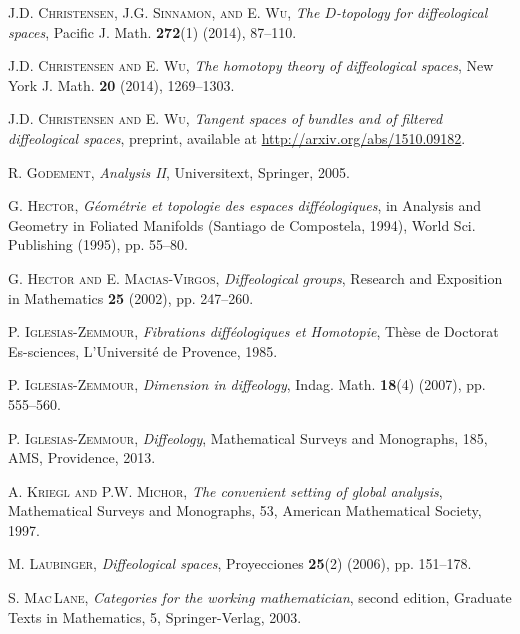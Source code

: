 \documentclass{amsart}
\theoremstyle{remark}
\begin{document}
\begin{thebibliography}{CSW}

     {\scshape J.D. Christensen, J.G. Sinnamon, and E. Wu},
    \emph{The $D$-topology for diffeological spaces},
    Pacific J. Math. \textbf{272}(1) (2014), 87--110.

     {\scshape J.D. Christensen and E. Wu},
    \emph{The homotopy theory of diffeological spaces},
    New York J. Math. \textbf{20} (2014), 1269--1303.

     {\scshape J.D. Christensen and E. Wu},
    \emph{Tangent spaces of bundles and of filtered diffeological spaces},
    preprint, available at \url{http://arxiv.org/abs/1510.09182}.

     {\scshape R. Godement},
    \emph{Analysis II},
    Universitext, Springer, 2005.

     {\scshape G. Hector},
    \emph{G\'eom\'etrie et topologie des espaces diff\'eologiques},
    in Analysis and Geometry in Foliated Manifolds (Santiago de Compostela, 1994),
    World Sci. Publishing (1995), pp. 55--80.

     {\scshape G. Hector and E. Macias-Virgos},
    \emph{Diffeological groups},
    Research and Exposition in Mathematics \textbf{25} (2002), pp. 247--260.

     {\scshape P. Iglesias-Zemmour},
    \emph{Fibrations diff\'eologiques et Homotopie},
    Th\`ese de Doctorat Es-sciences, L'Universit\'e de Provence, 1985.

     {\scshape P. Iglesias-Zemmour},
    \emph{Dimension in diffeology},
    Indag. Math. \textbf{18}(4) (2007), pp. 555--560.

     {\scshape P. Iglesias-Zemmour},
    \emph{Diffeology},
    Mathematical Surveys and Monographs, 185, AMS, Providence, 2013.

     {\scshape A. Kriegl and P.W. Michor},
    \emph{The convenient setting of global analysis},
    Mathematical Surveys and Monographs, 53, American Mathematical Society, 1997.

     {\scshape M. Laubinger},
    \emph{Diffeological spaces},
    Proyecciones \textbf{25}(2) (2006), pp. 151--178.


     {\scshape S. Mac\,Lane},
    \emph{Categories for the working mathematician},
    second edition, Graduate Texts in Mathematics, 5, Springer-Verlag, 2003.


\end{thebibliography}
\end{document}
